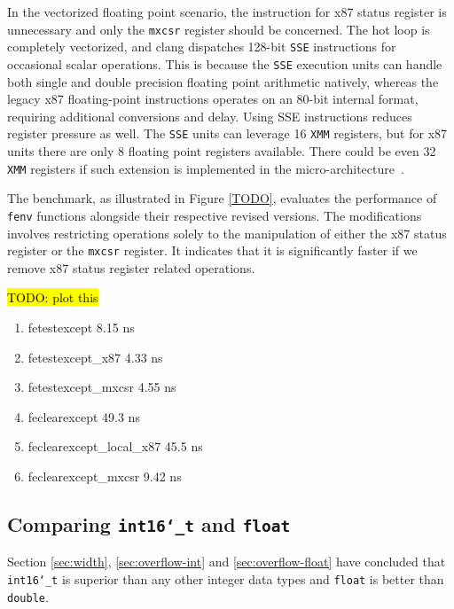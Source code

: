 \documentclass[logo,bsc,singlespacing,parskip]{infthesis}
\newcommand{\dtshort}{\texttt{int16\char`_t}}
\newcommand{\dtfloat}{\texttt{float}}
\newcommand{\dtdouble}{\texttt{double}}
\newcommand{\mxcsr}{\texttt{mxcsr}}
\newcommand{\xmm}{\texttt{XMM}}
\newenvironment{compactlist}
{ \begin{enumerate}
    \setlength{\itemsep}{0pt}
    \setlength{\parskip}{0pt}
    \setlength{\parsep}{0pt}     
}
{ \end{enumerate} }
\begin{document}
In the vectorized floating point scenario, the instruction for x87 status
register is unnecessary and only the \mxcsr{} register should be concerned. The
hot loop is completely vectorized, and clang dispatches 128-bit \texttt{SSE}
instructions for occasional scalar operations. This is because the \texttt{SSE}
execution units can handle both single and double precision floating point
arithmetic natively, whereas the legacy x87 floating-point instructions operates
on an 80-bit internal format, requiring additional conversions and delay. Using
SSE instructions reduces register pressure as well. The \texttt{SSE} units can
leverage 16 \xmm{} registers, but for x87 units there are only 8 floating point
registers available. There could be even 32 \xmm{} registers if such extension is
implemented in the micro-architecture~\cite{x87-bad}. 


The benchmark, as illustrated in Figure \ref{TODO}, evaluates the performance of
\texttt{fenv} functions alongside their respective revised versions. The
modifications involves restricting operations solely
to the manipulation of either the x87 status register or the \mxcsr{} register. 
It indicates that it is significantly faster if we remove x87 status register
related operations. 

\hl{TODO: plot this}
\small
\begin{compactlist}
\item fetestexcept                           8.15 ns
\item fetestexcept\_x87                       4.33 ns
\item fetestexcept\_mxcsr                     4.55 ns
\item feclearexcept                          49.3 ns
\item feclearexcept\_local\_x87                45.5 ns
\item feclearexcept\_mxcsr                    9.42 ns
\end{compactlist}
\normalsize

\subsection{Comparing \dtshort{} and \dtfloat{}}

Section \ref{sec:width}, \ref{sec:overflow-int} and \ref{sec:overflow-float}
have concluded that \dtshort{} is superior than any other integer data types and
\dtfloat{} is better than \dtdouble{}. 
\end{document}
